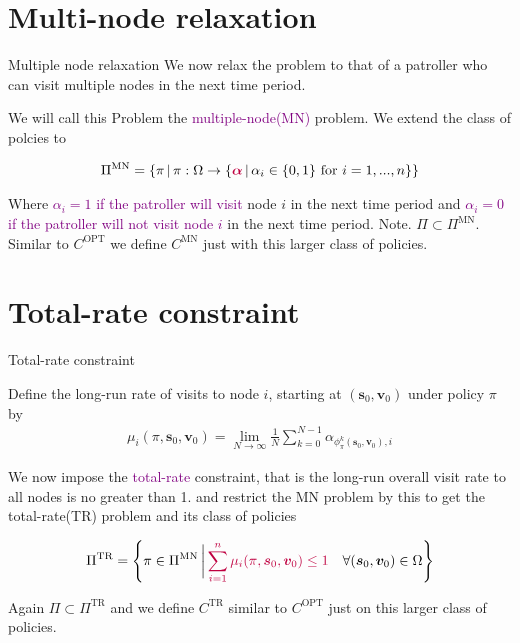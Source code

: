\documentclass[10pt]{beamer}
\begin{document}
\section{Multi-node relaxation}
\begin{frame}{Multiple node relaxation}
We now relax the problem to that of a patroller who can visit multiple nodes in the next time period.

We will call this Problem the \textcolor{purple}{multiple-node(MN)} problem. We extend the class of polcies to 

\begin{align*}
\Pi^{\text{MN}}= \{\pi \,  | \, \pi : \Omega \rightarrow \{\textcolor{purple}{\bm{\alpha}} \, | \, \alpha_{i} \in \{0,1 \} \text{ for } i=1,...,n \}   \}
\end{align*}

Where \textcolor{purple}{$\alpha_{i}=1$ if the patroller will visit} node $i$ in the next time period and \textcolor{purple}{$\alpha_{i}=0$ if the patroller will not visit node $i$} in the next time period.
Note. $\Pi \subset \Pi^{\text{MN}}$. Similar to $C^{\text{OPT}}$ we define $C^{\text{MN}}$ just with this larger class of policies.
\end{frame}

\section{Total-rate constraint}
\begin{frame}{Total-rate constraint}
\begin{definition}
Define the long-run rate of visits to node $i$, starting at $(\bm{s}_{0},\bm{v}_{0})$ under policy $\pi$ by
\begin{align*}
\mu_{i}(\pi,\bm{s}_{0},\bm{v}_{0})=\lim\limits_{N \rightarrow \infty} \frac{1}{N} \sum\limits_{k=0}^{N-1} \alpha_{\phi_{\pi}^{k}(\bm{s}_{0},\bm{v}_{0}),i}
\end{align*}
\end{definition}
\pause
We now impose the \textcolor{purple}{total-rate} constraint, that is the long-run overall visit rate to all nodes is no greater than 1. and restrict the MN problem by this to get the total-rate(TR) problem and its class of policies

\begin{align*}
\Pi^{\text{TR}}=\left\{ \pi \in \Pi^{\text{MN}} \, \bigg| \, \textcolor{purple}{\sum\limits_{i=1}^{n} \mu_{i}(\pi,\bm{s}_{0},\bm{v}_{0}) \leq 1} \quad \forall (\bm{s}_{0},\bm{v}_{0}) \in \Omega \right\}
\end{align*}

Again $\Pi \subset \Pi^{\text{TR}}$ and we define $C^{\text{TR}}$ similar to $C^{\text{OPT}}$ just on this larger class of policies.
\end{frame}
\end{document}
